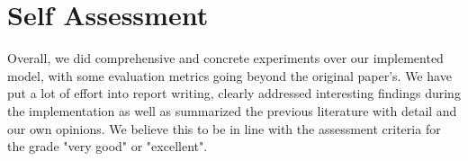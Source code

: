 \documentclass{article}
\begin{document}


\section{Self Assessment}

Overall, we did comprehensive and concrete experiments over our implemented model, with some evaluation metrics going beyond the original paper's. We have put a lot of effort into report writing, clearly addressed interesting findings during the implementation as well as summarized the previous literature with detail and our own opinions. We believe this to be in line with the assessment criteria for the grade "very good" or "excellent".


\medskip

\small


\end{document}
